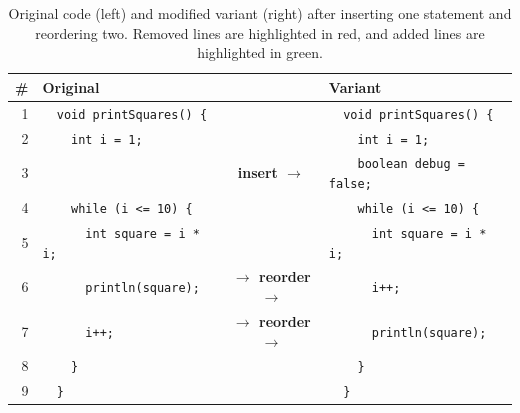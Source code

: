 \begin{samepage}
\begin{table}
	\centering
	\begin{tabular}{rlcl}
		\toprule
		\textbf{\#} & \textbf{Original}                              &                  & \textbf{Variant}                                   \\
		\midrule
		1           & \texttt{~~void printSquares() \{}              &                                    & \texttt{~~void printSquares() \{}                  \\
		2           & \texttt{~~~~int i = 1;}                        &                                    & \texttt{~~~~int i = 1;}                            \\
				
		3           &                                                & \small\textbf{\phantom{$\to$}  insert $\to$} & \cellcolor{add}\texttt{~~~~boolean debug = false;} \\
				
		4           & \texttt{~~~~while (i <= 10) \{}                &                                    & \texttt{~~~~while (i <= 10) \{}                    \\
		5           & \texttt{~~~~~~int square = i * i;}             &                                    & \texttt{~~~~~~int square = i * i;}                 \\
		6           & \cellcolor{del}\texttt{~~~~~~println(square);} & \small\textbf{$\to$ reorder $\to$} & \cellcolor{add} \texttt{~~~~~~i++;}                \\
		7           & \cellcolor{del}\texttt{~~~~~~i++;}             & \small\textbf{$\to$ reorder $\to$} & \cellcolor{add} \texttt{~~~~~~println(square);}    \\
		8           & \texttt{~~~~\}}                                &                                    & \texttt{~~~~\}}                                    \\
		9           & \texttt{~~\}}                                  &                                    & \texttt{~~\}}                                      \\
		\bottomrule
	\end{tabular}
    \caption[Example Obfuscation: Insertion and Reordering]{Original code (left) and modified variant (right) after inserting one statement and reordering two. Removed lines are highlighted in red, and added lines are highlighted in green.}
	\label{tab:codesnippet}
\end{table}



\end{samepage}
